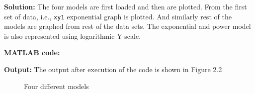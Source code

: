 \noindent \textbf{Solution:}
\noindent The four models are first loaded and then are plotted. From the first set of data, i.e., \texttt{xy1}  exponential graph is plotted. And similarly rest of the models are graphed from rest of the data sets. The exponential and power model is also represented using logarithmic Y scale.

\noindent \textbf{MATLAB code:}


\noindent \textbf{Output:}
\noindent The output after execution of the code is shown in Figure 2.2
\begin{figure}[H]
    \centering
    \qquad
\end{figure}
\begin{figure}[H]
    \centering
    \qquad
    \caption{Four different models}
\end{figure}

